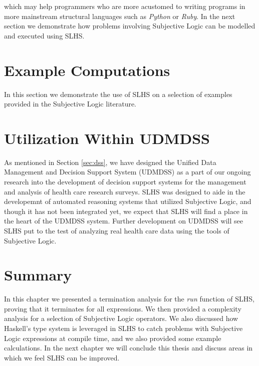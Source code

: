 \documentclass[thesis.tex]{subfiles}
\begin{document}
which may help programmers who are more acustomed to writing programs in more mainstream
structural languages such as \emph{Python} or \emph{Ruby}. In the next section we demonstrate how
problems involving Subjective Logic can be modelled and executed using SLHS.


\section{Example Computations}

In this section we demonstrate the use of SLHS on a selection of examples provided in the
Subjective Logic literature.





\section{Utilization Within UDMDSS}

As mentioned in Section \ref{sec:dss}, we have designed the Unified Data Management
and Decision Support System (UDMDSS)
as a part of our ongoing research into the development of decision support systems for
the management and analysis of health care research surveys. SLHS was designed to aide in the
developemnt of automated reasoning systems that utilized Subjective Logic, and though it has
not been integrated yet, we expect that SLHS will find a place in the heart of the UDMDSS
system. Further development on UDMDSS will see SLHS put to the test of analyzing real health care
data using the tools of Subjective Logic.




\section{Summary}

In this chapter we presented a termination analysis for the \emph{run} function of SLHS, proving
that it terminates for all expressions. We then provided a complexity analysis for a selection
of Subjective Logic operators. We also discussed how Haskell's type system is leveraged in SLHS
to catch problems with Subjective Logic expressions at compile time, and we also provided some
example calculations. In the next chapter we will conclude this thesis and discuss areas in which
we feel SLHS can be improved.
\end{document}
